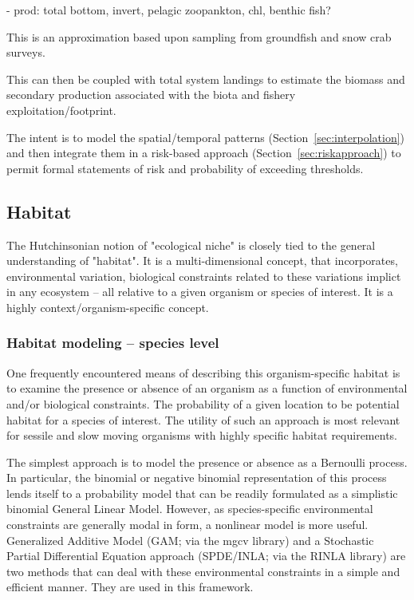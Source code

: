 \documentclass[letterpaper,portrait,11pt]{scrartcl}
\numberwithin{equation}{section}		%
\numberwithin{figure}{section}			%
\numberwithin{table}{section}				%
\begin{document}
- prod: total bottom, invert, pelagic zoopankton, chl, benthic fish?


This is an approximation based upon sampling from groundfish and snow crab surveys. 

This can then be coupled with total system landings to estimate the biomass and secondary production associated with the biota and fishery exploitation/footprint. 

The intent is to model the spatial/temporal patterns (Section~\ref{sec:interpolation}) and then integrate them in a risk-based approach (Section~\ref{sec:riskapproach}) to permit formal statements of risk and probability of exceeding thresholds. 


\subsection{Habitat}

The Hutchinsonian notion of "ecological niche" is closely tied to the general understanding of "habitat". It is a multi-dimensional concept, that incorporates, environmental variation, biological constraints related to these variations implict in any ecosystem -- all relative to a given organism or species of interest. It is a highly context/organism-specific concept. 


\subsubsection{Habitat modeling -- species level}
\label{sec:habitatSpecies}
One frequently encountered means of describing this organism-specific habitat is to examine the presence or absence of an organism as a function of environmental and/or biological constraints. The probability of a given location to be potential habitat for a species of interest. The utility of such an approach is most relevant for sessile and slow moving organisms with highly specific habitat requirements. 

The simplest approach is to model the presence or absence as a Bernoulli process. In particular, the binomial or negative binomial representation of this process lends itself to a probability model that can be readily formulated as a simplistic binomial General Linear Model. However, as species-specific environmental constraints are generally modal in form, a nonlinear model is more useful. Generalized Additive Model (GAM; via the mgcv library) and a Stochastic Partial Differential Equation approach (SPDE/INLA; via the RINLA library) are two methods that can deal with these environmental constraints in a simple and efficient manner. They are used in this framework.
\end{document}
